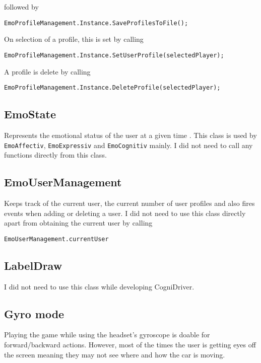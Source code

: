followed by

\begin{Verbatim}[frame=single, framesep=3mm, label={[Beginning of code]End of code}]
EmoProfileManagement.Instance.SaveProfilesToFile();
\end{Verbatim}

On selection of a profile, this is set by calling

\begin{Verbatim}[frame=single, framesep=3mm, label={[Beginning of code]End of code}]
EmoProfileManagement.Instance.SetUserProfile(selectedPlayer);
\end{Verbatim}

A profile is delete by calling

\begin{Verbatim}[frame=single, framesep=3mm, label={[Beginning of code]End of code}]
EmoProfileManagement.Instance.DeleteProfile(selectedPlayer);
\end{Verbatim}

\subsection{EmoState}
Represents the emotional status of the user at a given time \cite{emotivSDKUserManual}. This class is used by \texttt{EmoAffectiv}, \texttt{EmoExpressiv} and \texttt{EmoCognitiv} mainly. I did not need to call any functions directly from this class.

\subsection{EmoUserManagement}
Keeps track of the current user, the current number of user profiles and also fires events when adding or deleting a user. I did not need to use this class directly apart from obtaining the current user by calling

\begin{Verbatim}[frame=single, framesep=3mm, label={[Beginning of code]End of code}]
EmoUserManagement.currentUser
\end{Verbatim}

\subsection{LabelDraw}
I did not need to use this class while developing CogniDriver.

\subsection{Gyro mode}
Playing the game while using the headset's gyroscope is doable for forward/backward actions. However, most of the times the user is getting eyes off the screen meaning they may not see where and how the car is moving. 

